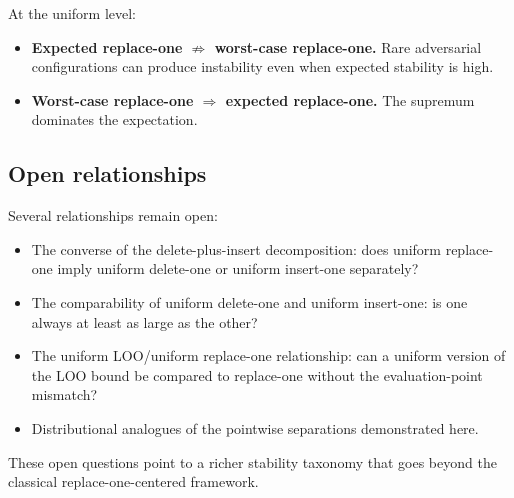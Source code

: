 At the uniform level:
\begin{itemize}
\item \textbf{Expected replace-one $\not\Rightarrow$ worst-case replace-one.}
    Rare adversarial configurations can produce instability even when expected
    stability is high.
\item \textbf{Worst-case replace-one $\Rightarrow$ expected replace-one.}
    The supremum dominates the expectation.
\end{itemize}



\subsection{Open relationships}

Several relationships remain open:
\begin{itemize}
\item The converse of the delete-plus-insert decomposition: does uniform
    replace-one imply uniform delete-one or uniform insert-one separately?
\item The comparability of uniform delete-one and uniform insert-one: is one
    always at least as large as the other?
\item The uniform LOO/uniform replace-one relationship: can a uniform version
    of the LOO bound be compared to replace-one without the evaluation-point
    mismatch?
\item Distributional analogues of the pointwise separations demonstrated here.
\end{itemize}

These open questions point to a richer stability taxonomy that goes beyond the
classical replace-one-centered framework.
